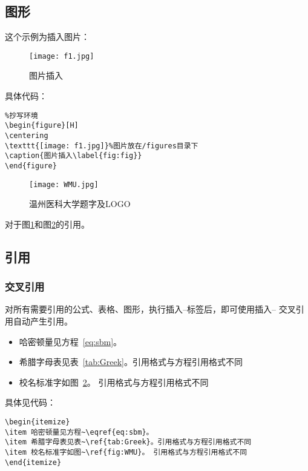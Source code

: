 \subsection{图形}
这个示例为插入图片：
\begin{figure}[H]
    \centering
    \texttt{[image: f1.jpg]}%
    \caption{图片插入\label{fig:fig}}
\end{figure}

具体代码：
\begin{verbatim}
%抄写环境
\begin{figure}[H]
\centering
\texttt{[image: f1.jpg]}%图片放在/figures目录下
\caption{图片插入\label{fig:fig}}
\end{figure}
\end{verbatim}
\begin{figure}[H]
    \centering
    \texttt{[image: WMU.jpg]}
    \caption{温州医科大学题字及LOGO\label{fig:WMU}}
\end{figure}
对于图\ref{fig:fig}和图\ref{fig:WMU}的引用。


\subsection{引用}
\subsubsection{交叉引用}
对所有需要引用的公式、表格、图形，执行插入--标签后，即可使用插入-- 交叉引用自动产生引用。
\begin{itemize}
    \item 哈密顿量见方程~\eqref{eq:sbm}。
    \item 希腊字母表见表~\ref{tab:Greek}。引用格式与方程引用格式不同
    \item 校名标准字如图~\ref{fig:WMU}。 引用格式与方程引用格式不同
\end{itemize}
具体见代码：
\begin{verbatim}
\begin{itemize}
\item 哈密顿量见方程~\eqref{eq:sbm}。
\item 希腊字母表见表~\ref{tab:Greek}。引用格式与方程引用格式不同
\item 校名标准字如图~\ref{fig:WMU}。 引用格式与方程引用格式不同
\end{itemize}
\end{verbatim}


